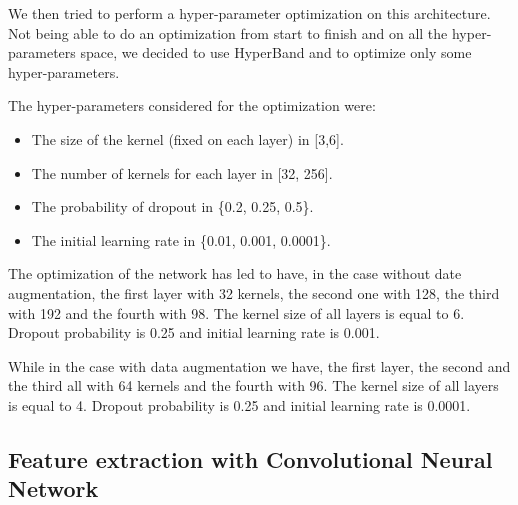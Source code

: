 We then tried to perform a hyper-parameter optimization on this architecture.
Not being able to do an optimization from start to finish and on all the hyper-parameters space, we decided to use HyperBand and to optimize only some hyper-parameters.

The hyper-parameters considered for the optimization were: 
\begin{itemize}
    \item The size of the kernel (fixed on each layer) in [3,6].
    \item The number of kernels for each layer in [32, 256].
    \item The probability of dropout in \{0.2, 0.25, 0.5\}.
    \item The initial learning rate in \{0.01, 0.001, 0.0001\}.
\end{itemize}

The optimization of the network has led to have, in the case without date augmentation, the first layer with 32 kernels, the second one with 128, the third with 192 and the fourth with 98. The kernel size of all layers is equal to 6. Dropout probability is 0.25 and initial learning rate is 0.001.

While in the case with data augmentation we have, the first layer, the second and the third all with 64 kernels and the fourth with 96. The kernel size of all layers is equal to 4. Dropout probability is 0.25 and initial learning rate is 0.0001.

\subsection{Feature extraction with Convolutional Neural Network}

